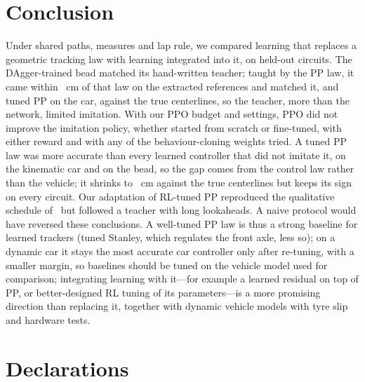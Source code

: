 \documentclass{IJCAS}
\begin{document}
\section{Conclusion}
Under shared paths, measures and lap rule, we compared learning that replaces a geometric tracking law with learning integrated into it, on held-out circuits. The DAgger-trained bead matched its hand-written teacher; taught by the PP law, it came within \VcmpBppTeachDiff~cm of that law on the extracted references and matched it, and tuned PP on the car, against the true centerlines, so the teacher, more than the network, limited imitation. With our PPO budget and settings, PPO did not improve the imitation policy, whether started from scratch or fine-tuned, with either reward and with any of the behaviour-cloning weights tried. A tuned PP law was more accurate than every learned controller that did not imitate it, on the kinematic car and on the bead, so the gap comes from the control law rather than the vehicle; it shrinks to \VtruePoneDiff~cm against the true centerlines but keeps its sign on every circuit. Our adaptation of RL-tuned PP reproduced the qualitative schedule of~\cite{elgouhary2026} but followed a teacher with long lookaheads. A naive protocol would have reversed these conclusions. A well-tuned PP law is thus a strong baseline for learned trackers (tuned Stanley, which regulates the front axle, less so); on a dynamic car it stays the most accurate car controller only after re-tuning, with a smaller margin, so baselines should be tuned on the vehicle model used for comparison; integrating learning with it---for example a learned residual on top of PP, or better-designed RL tuning of its parameters---is a more promising direction than replacing it, together with dynamic vehicle models with tyre slip and hardware tests.




\section*{Declarations}
\end{document}
